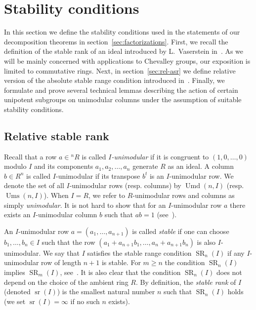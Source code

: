 \documentclass[11pt]{amsart}
\theoremstyle{plain}
\numberwithin{equation}{section}
\numberwithin{lemma}{section}
\theoremstyle{definition}
\theoremstyle{remark}
\DeclareMathOperator{\SR}{SR}
\DeclareMathOperator{\sr}{sr}
\DeclareMathOperator{\Ums}{Ums}
\DeclareMathOperator{\Umd}{Umd}
\begin{document}
\section{Stability conditions}\label{sec:stability-conditions}
In this section we define the stability conditions used in the statements of our decomposition theorems in section~\ref{sec:factorizations}.
First, we recall the definition of the stable rank of an ideal introduced by L.~Vaserstein in~\cite{Va69, Va71}.
As we will be mainly concerned with applications to Chevalley groups, our exposition is limited to commutative rings.
Next, in section~\ref{sec:rel-asr} we define relative version of the absolute stable range condition introduced in~\cite{EO, MKV}.
Finally, we formulate and prove several technical lemmas describing the action of certain unipotent subgroups on unimodular columns under the assumption of suitable stability conditions.

\subsection{Relative stable rank}
Recall that a row $a\in{}^n\!R$ is called \emph{$I$-unimodular} if it is congruent to $(1, 0, \ldots, 0)$ modulo $I$ and its components $a_1, a_2, \ldots, a_n$ generate $R$ as an ideal.
A column $b \in R^n$ is called $I$-unimodular if its transpose $b^t$ is an $I$-unimodular row.
We denote the set of all $I$-unimodular rows (resp. columns) by $\Umd(n, I)$ (resp. $\Ums(n, I)$).
When $I=R$, we refer to $R$-unimodular rows and columns as simply \emph{unimodular}.
It is not hard to show that for an $I$-unimodular row $a$ there exists an $I$-unimodular column $b$ such that $ab=1$ (see~\cite[\S2]{Va69}).

An $I$-unimodular row $a=(a_1, \ldots, a_{n+1})$ is called \emph{stable} if one can choose $b_1, \ldots, b_n\in I$ such that the row $(a_1+a_{n+1}b_1, \ldots, a_n+a_{n+1}b_n)$ is also $I$-unimodular. 
We say that $I$ satisfies the stable range condition $\SR_n(I)$ if any $I$-unimodular row of length $n+1$ is stable.
For $m \geqslant n$ the condition $\SR_n(I)$ implies $\SR_m(I)$, see~\cite[Theorem~1]{Va71}.
It is also clear that the condition $\SR_n(I)$ does not depend on the choice of the ambient ring $R$.
By definition, the \emph{stable rank} of $I$ (denoted $\sr(I)$) is the smallest natural number $n$ such that $\SR_n(I)$ holds (we set $\sr(I)=\infty$ if no such $n$ exists).
\end{document}
